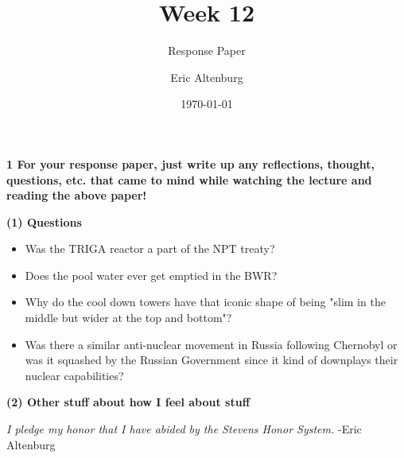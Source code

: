 \documentclass[12pt]{turabian-researchpaper}
\title{Week 12}
\subtitle{Response Paper}
\author{Eric Altenburg}
\date{\today}
\newcommand\question[2]{\noindent\textbf{#1 \quad #2}}
\renewcommand\part[2]{\vspace{.10in}\textbf{(#1) \quad #2}\par}
\begin{document}
\maketitle

\question{1}{For your response paper, just write up any reflections, thought, questions, etc. that came to mind while watching the lecture and reading the above paper!}

	\part{1}{Questions}
	\begin{itemize}
		\item Was the TRIGA reactor a part of the NPT treaty?
		\item Does the pool water ever get emptied in the BWR?
		\item Why do the cool down towers have that iconic shape of being "slim in the middle but wider at the top and bottom"?
		\item Was there a similar anti-nuclear movement in Russia following Chernobyl or was it squashed by the Russian Government since it kind of downplays their nuclear capabilities?
	\end{itemize}

	\part{2}{Other stuff about how I feel about stuff}


\vspace*{\fill}
\noindent\textit{I pledge my honor that I have abided by the Stevens Honor System.} -Eric Altenburg
\end{document}
